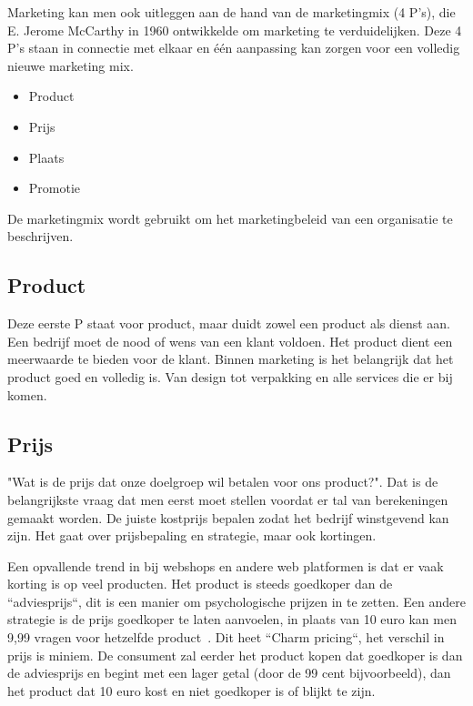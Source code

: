 Marketing kan men ook uitleggen aan de hand van de marketingmix (4 P's), die E. Jerome McCarthy in 1960 ontwikkelde om marketing te verduidelijken. Deze 4 P's staan in connectie met elkaar en één aanpassing kan zorgen voor een volledig nieuwe marketing mix.~\autocite{Forsey2019}

\begin{itemize}
	\item Product
	\item Prijs
	\item Plaats
	\item Promotie
\end{itemize}

De marketingmix wordt gebruikt om het marketingbeleid van een organisatie te beschrijven. 

\subsection{Product} \label{sec:marketing-product}
Deze eerste P staat voor product, maar duidt zowel een product als dienst aan. Een bedrijf moet de nood of wens van een klant voldoen. Het product dient een meerwaarde te bieden voor de klant. Binnen marketing is het belangrijk dat het product goed en volledig is. Van design tot verpakking en alle services die er bij komen.
 
\subsection{Prijs} \label{sec:marketing-prijs}
"Wat is de prijs dat onze doelgroep wil betalen voor ons product?". Dat is de belangrijkste vraag dat men eerst moet stellen voordat er tal van berekeningen gemaakt worden. De juiste kostprijs bepalen zodat het bedrijf winstgevend kan zijn. Het gaat over prijsbepaling en strategie, maar ook kortingen.

Een opvallende trend in bij webshops en andere web platformen is dat er vaak korting is op veel producten. Het product is steeds goedkoper dan de ``adviesprijs``, dit is een manier om psychologische prijzen in te zetten. Een andere strategie is de prijs goedkoper te laten aanvoelen, in plaats van 10 euro kan men 9,99 vragen voor hetzelfde product~\autocite{InternetMarketingUniversiteit2016}. Dit heet ``Charm pricing``, het verschil in prijs is miniem. De consument zal eerder het product kopen dat goedkoper is dan de adviesprijs en begint met een lager getal (door de 99 cent bijvoorbeeld), dan het product dat 10 euro kost en niet goedkoper is of blijkt te zijn.

